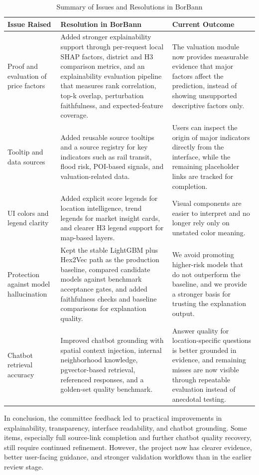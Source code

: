 \begin{table}[htbp]
    \centering
    \small
    \renewcommand{\arraystretch}{1.25}
    \begin{tabularx}{\textwidth}{>{\raggedright\arraybackslash}p{}>{\raggedright\arraybackslash}X>{\raggedright\arraybackslash}p{}}
        \toprule
        \rowcolor[gray]{0.9} \textbf{Issue Raised} & \textbf{Resolution in BorBann} & \textbf{Current Outcome} \\
        \midrule
        Proof and evaluation of price factors & Added stronger explainability support through per-request local SHAP factors, district and H3 comparison metrics, and an explainability evaluation pipeline that measures rank correlation, top-k overlap, perturbation faithfulness, and expected-feature coverage. & The valuation module now provides measurable evidence that major factors affect the prediction, instead of showing unsupported descriptive factors only. \\
        Tooltip and data sources & Added reusable source tooltips and a source registry for key indicators such as rail transit, flood risk, POI-based signals, and valuation-related data. & Users can inspect the origin of major indicators directly from the interface, while the remaining placeholder links are tracked for completion. \\
        UI colors and legend clarity & Added explicit score legends for location intelligence, trend legends for market insight cards, and clearer H3 legend support for map-based layers. & Visual components are easier to interpret and no longer rely only on unstated color meaning. \\
        Protection against model hallucination & Kept the stable LightGBM plus Hex2Vec path as the production baseline, compared candidate models against benchmark acceptance gates, and added faithfulness checks and baseline comparisons for explanation quality. & We avoid promoting higher-risk models that do not outperform the baseline, and we provide a stronger basis for trusting the explanation output. \\
        Chatbot retrieval accuracy & Improved chatbot grounding with spatial context injection, internal neighborhood knowledge, pgvector-based retrieval, referenced responses, and a golden-set quality benchmark. & Answer quality for location-specific questions is better grounded in evidence, and remaining misses are now visible through repeatable evaluation instead of anecdotal testing. \\
        \bottomrule
    \end{tabularx}
    \caption{Summary of Issues and Resolutions in BorBann}
    \label{tab:committee-rebuttal-summary}
\end{table}

In conclusion, the committee feedback led to practical improvements in explainability, transparency, interface readability, and chatbot grounding. Some items, especially full source-link completion and further chatbot quality recovery, still require continued refinement. However, the project now has clearer evidence, better user-facing guidance, and stronger validation workflows than in the earlier review stage.
